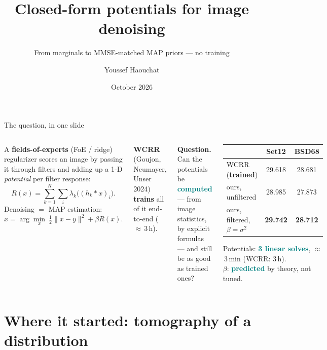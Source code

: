 \documentclass[10pt,aspectratio=169]{beamer}
\title{Closed-form potentials for image denoising}
\subtitle{From marginals to MMSE-matched MAP priors --- no training}
\author{Youssef Haouchat}
\institute{EPFL --- Biomedical Imaging Group}
\date{October 2026}
\newcommand{\EXP}[1]{\textcolor{teal}{\textbf{#1}}}
\newcommand{\TRN}[1]{\textcolor{wine}{\textbf{#1}}}
\newcommand{\WSt}{29.618}\newcommand{\WBs}{28.681}           %
\begin{document}
\maketitle

\begin{frame}{The question, in one slide}
\begin{columns}[T]
\small
A \textbf{fields-of-experts} (FoE / ridge) regularizer scores an image by passing it
through filters and adding up a 1-D \emph{potential} per filter response:
\[
  R(x)=\sum_{k=1}^{K}\sum_{i}\lambda_k\big((h_k*x)_i\big).
\]
Denoising $=$ MAP estimation:
\[\hat x=\arg\min_x\ \tfrac12\|x-y\|^2+\beta R(x).\]

\medskip
\textbf{WCRR} (Goujon, Neumayer, Unser 2024) \TRN{trains} all of it end-to-end ($\approx$\,3\,h).

\smallskip
\textbf{Question.} Can the potentials be \EXP{computed} --- from image statistics,
by explicit formulas --- and still be as good as trained ones?
\begin{keybox}[title={Answer (same 60 filters as WCRR, $\sigma=25$)}]
\footnotesize
\begin{tabular}{@{}lcc@{}}
 & Set12 & BSD68\\\midrule
WCRR (\TRN{trained}) & \WSt & \WBs\\
ours, unfiltered & 28.985 & 27.873\\
ours, filtered, $\beta=\sigma^2$ & \textbf{29.742} & \textbf{28.712}\\
\end{tabular}

\medskip
Potentials: \EXP{3 linear solves}, $\approx$\,3\,min (WCRR: 3\,h).\\
$\beta$: \EXP{predicted} by theory, not tuned.
\end{keybox}
\end{columns}
\end{frame}

\section{Where it started: tomography of a distribution}
\end{document}
